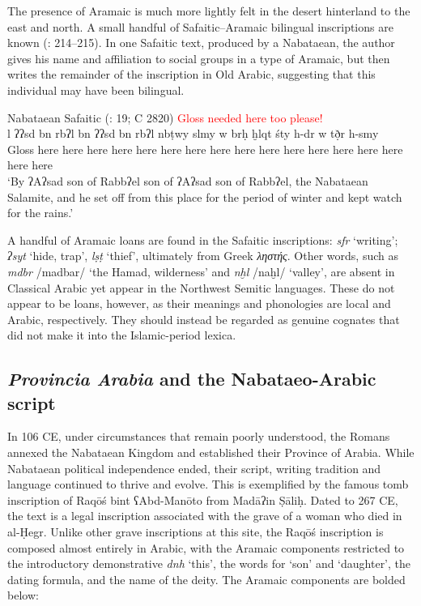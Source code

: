 \documentclass[output=paper]{langsci/langscibook}
\begin{document}
The presence of Aramaic is much more lightly felt in the desert hinterland to the east and north. A small handful of Safaitic--Aramaic bilingual inscriptions are known (\citealt{Hayajneh2009}: 214--215). In one Safaitic text, produced by a Nabataean, the author gives his name and affiliation to social groups in a type of Aramaic, but then writes the remainder of the inscription in Old Arabic, suggesting that this individual may have been bilingual. 

\ea Nabataean Safaitic (\citealt{Al-Jallad2015Safaitic}: 19; C 2820) \textcolor{red}{Gloss needed here too please!} \\ 
\gll l ʔʔsd bn rbʔl bn ʔʔsd bn rbʔl nbṭwy slmy w brḥ ḫlqt śty h-dr w tð̣r h-smy \\
Gloss here here here here here here here here here here here here here here here here here \\
\glt `By ʔAʔsad son of Rabbʔel son of  ʔAʔsad son of Rabbʔel, the Nabataean Salamite, and he set off from this place for the period of winter and kept watch for the rains.' \\
\z

A handful of Aramaic loans are found in the Safaitic inscriptions: \textit{sfr} ‘writing’; \textit{ʔsyt} ‘hide, trap’, \textit{lṣṭ} ‘thief’, ultimately from Greek \textit{ληστής}. Other words, such as \textit{mdbr} /madbar/ ‘the Hamad, wilderness’ and \textit{nḫl} /naḫl/ ‘valley’, are absent in Classical Arabic yet appear in the Northwest Semitic languages. These do not appear to be loans, however, as their meanings and phonologies are local and Arabic, respectively. They should instead be regarded as genuine cognates that did not make it into the Islamic-period lexica. 

\subsection{\textit{Provincia Arabia} and the Nabataeo-Arabic script}\label{Provincia}
In 106 CE, under circumstances that remain poorly understood, the Romans annexed the Nabataean Kingdom and established their Province of Arabia. While Nabataean political independence ended, their script, writing tradition and language continued to thrive and evolve. This is exemplified by the famous tomb inscription of Raqōś bint ʕAbd-Manōto from Madāʔin Ṣāliḥ. Dated to 267 CE, the text is a legal inscription associated with the grave of a woman who died in al-Ḥegr. Unlike other grave inscriptions at this site, the Raqōś inscription is composed almost entirely in Arabic, with the Aramaic components restricted to the introductory demonstrative \textit{dnh} ‘this’, the words for ‘son’ and ‘daughter’, the dating formula, and the name of the deity. The Aramaic components are bolded below:
\end{document}
